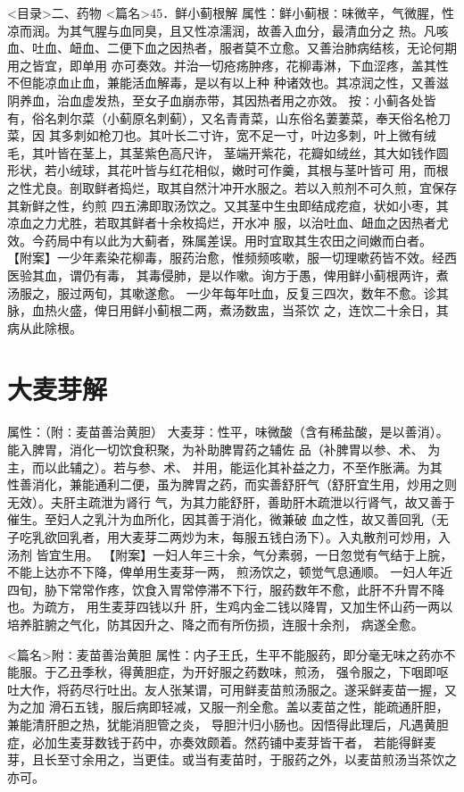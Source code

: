 \documentclass[a4paper,12pt,UTF8,twoside]{ctexbook}
\begin{document}
<目录>二、药物
<篇名>45．鲜小蓟根解
属性：鲜小蓟根∶味微辛，气微腥，性凉而润。为其气腥与血同臭，且又性凉濡润，故善入血分，最清血分之 
热。凡咳血、吐血、衄血、二便下血之因热者，服者莫不立愈。又善治肺病结核，无论何期用之皆宜，即单用 
亦可奏效。并治一切疮疡肿疼，花柳毒淋，下血涩疼，盖其性不但能凉血止血，兼能活血解毒，是以有以上种 
种诸效也。其凉润之性，又善滋阴养血，治血虚发热，至女子血崩赤带，其因热者用之亦效。 
按∶小蓟各处皆有，俗名刺尔菜（小蓟原名刺蓟），又名青青菜，山东俗名萋萋菜，奉天俗名枪刀菜，因 
其多刺如枪刀也。其叶长二寸许，宽不足一寸，叶边多刺，叶上微有绒毛，其叶皆在茎上，其茎紫色高尺许， 
茎端开紫花，花瓣如绒丝，其大如钱作圆形状，若小绒球，其花叶皆与红花相似，嫩时可作羹，其根与茎叶皆可 
用，而根之性尤良。剖取鲜者捣烂，取其自然汁冲开水服之。若以入煎剂不可久煎，宜保存其新鲜之性，约煎 
四五沸即取汤饮之。又其茎中生虫即结成疙疸，状如小枣，其凉血之力尤胜，若取其鲜者十余枚捣烂，开水冲 
服，以治吐血、衄血之因热者尤效。今药局中有以此为大蓟者，殊属差误。用时宜取其生农田之间嫩而白者。 
【附案】一少年素染花柳毒，服药治愈，惟频频咳嗽，服一切理嗽药皆不效。经西医验其血，谓仍有毒， 
其毒侵肺，是以作嗽。询方于愚，俾用鲜小蓟根两许，煮汤服之，服过两旬，其嗽遂愈。 
一少年每年吐血，反复三四次，数年不愈。诊其脉，血热火盛，俾日用鲜小蓟根二两，煮汤数盅，当茶饮 
之，连饮二十余日，其病从此除根。 


\chapter{大麦芽解}
属性：（附∶麦苗善治黄胆） 
大麦芽∶性平，味微酸（含有稀盐酸，是以善消）。能入脾胃，消化一切饮食积聚，为补助脾胃药之辅佐 
品（补脾胃以参、术、 为主，而以此辅之）。若与参、术、 并用，能运化其补益之力，不至作胀满。为其 
性善消化，兼能通利二便，虽为脾胃之药，而实善舒肝气（舒肝宜生用，炒用之则无效）。夫肝主疏泄为肾行 
气，为其力能舒肝，善助肝木疏泄以行肾气，故又善于催生。至妇人之乳汁为血所化，因其善于消化，微兼破 
血之性，故又善回乳（无子吃乳欲回乳者，用大麦芽二两炒为末，每服五钱白汤下）。入丸散剂可炒用，入汤剂 
皆宜生用。 
【附案】一妇人年三十余，气分素弱，一日忽觉有气结于上脘，不能上达亦不下降，俾单用生麦芽一两， 
煎汤饮之，顿觉气息通顺。 
一妇人年近四旬，胁下常常作疼，饮食入胃常停滞不下行，服药数年不愈，此肝不升胃不降也。为疏方， 
用生麦芽四钱以升 
肝，生鸡内金二钱以降胃，又加生怀山药一两以培养脏腑之气化，防其因升之、降之而有所伤损，连服十余剂， 
病遂全愈。 

<篇名>附∶麦苗善治黄胆
属性：内子王氏，生平不能服药，即分毫无味之药亦不能服。于乙丑季秋，得黄胆症，为开好服之药数味，煎汤， 
强令服之，下咽即呕吐大作，将药尽行吐出。友人张某谓，可用鲜麦苗煎汤服之。遂采鲜麦苗一握，又为之加 
滑石五钱，服后病即轻减，又服一剂全愈。盖以麦苗之性，能疏通肝胆，兼能清肝胆之热，犹能消胆管之炎， 
导胆汁归小肠也。因悟得此理后，凡遇黄胆症，必加生麦芽数钱于药中，亦奏效颇着。然药铺中麦芽皆干者， 
若能得鲜麦芽，且长至寸余用之，当更佳。或当有麦苗时，于服药之外，以麦苗煎汤当茶饮之亦可。 
\end{document}
